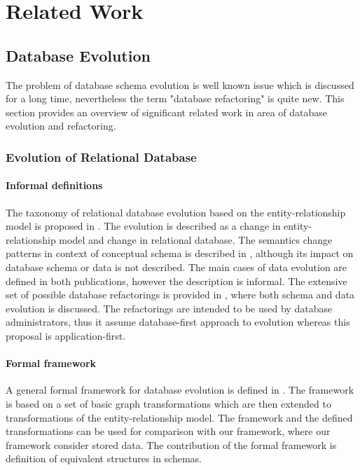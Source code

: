 \documentclass[11pt]{article}
\begin{document}
\section{Related Work}



\subsection{Database Evolution}
The problem of database schema evolution is well known issue which is discussed for a long time, nevertheless the term "database refactoring" is quite new. This section provides an overview of significant related work in area of database evolution and refactoring. 

\subsubsection{Evolution of Relational Database}
\paragraph{Informal definitions} The taxonomy of relational database evolution based on the entity-relationship model  is proposed in \cite{Roddick:TaxonomyOnERM}. The evolution is described as a change in entity-relationship model and change in relational database.  The semantics change patterns in context of conceptual schema is described in \cite{Wedemeijer:SemanticChangePatternsInConceptualSchema}, although its impact on database schema or data is not described. The main cases of data evolution are defined in both publications, however the description is informal. The extensive set of possible database refactorings is provided in \cite{Ambler:DbRefactoringBook}, where both schema and data evolution is discussed. The refactorings are intended to be used by database administrators, thus it assume database-first approach to evolution whereas this proposal is application-first.   

\paragraph{Formal framework} A general formal framework for database evolution is defined in \cite{McBrien:formal-framework-transformation}. The framework is based on a set of basic graph transformations which are then extended to transformations of the entity-relationship model. The framework and the defined transformations can be used for comparison with our framework, where our framework consider stored data. The contribution of the formal framework is definition of equivalent structures in schemas.
\end{document}
